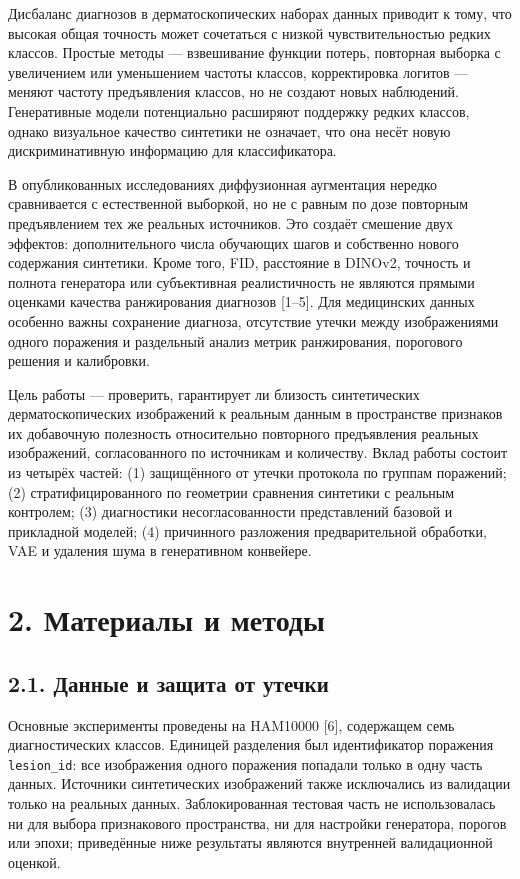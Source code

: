 \documentclass[12pt,a4paper]{article}
\begin{document}
Дисбаланс диагнозов в дерматоскопических наборах данных приводит к тому, что высокая общая точность может сочетаться с низкой чувствительностью редких классов. Простые методы --- взвешивание функции потерь, повторная выборка с увеличением или уменьшением частоты классов, корректировка логитов --- меняют частоту предъявления классов, но не создают новых наблюдений. Генеративные модели потенциально расширяют поддержку редких классов, однако визуальное качество синтетики не означает, что она несёт новую дискриминативную информацию для классификатора.

В опубликованных исследованиях диффузионная аугментация нередко сравнивается с естественной выборкой, но не с равным по дозе повторным предъявлением тех же реальных источников. Это создаёт смешение двух эффектов: дополнительного числа обучающих шагов и собственно нового содержания синтетики. Кроме того, FID, расстояние в DINOv2, точность и полнота генератора или субъективная реалистичность не являются прямыми оценками качества ранжирования диагнозов [1--5]. Для медицинских данных особенно важны сохранение диагноза, отсутствие утечки между изображениями одного поражения и раздельный анализ метрик ранжирования, порогового решения и калибровки.

Цель работы --- проверить, гарантирует ли близость синтетических дерматоскопических изображений к реальным данным в пространстве признаков их добавочную полезность относительно повторного предъявления реальных изображений, согласованного по источникам и количеству. Вклад работы состоит из четырёх частей: (1) защищённого от утечки протокола по группам поражений; (2) стратифицированного по геометрии сравнения синтетики с реальным контролем; (3) диагностики несогласованности представлений базовой и прикладной моделей; (4) причинного разложения предварительной обработки, VAE и удаления шума в генеративном конвейере.

\section*{2. Материалы и методы}

\subsection*{2.1. Данные и защита от утечки}

Основные эксперименты проведены на HAM10000 [6], содержащем семь диагностических классов. Единицей разделения был идентификатор поражения \texttt{lesion\_id}: все изображения одного поражения попадали только в одну часть данных. Источники синтетических изображений также исключались из валидации только на реальных данных. Заблокированная тестовая часть не использовалась ни для выбора признакового пространства, ни для настройки генератора, порогов или эпохи; приведённые ниже результаты являются внутренней валидационной оценкой.
\end{document}
